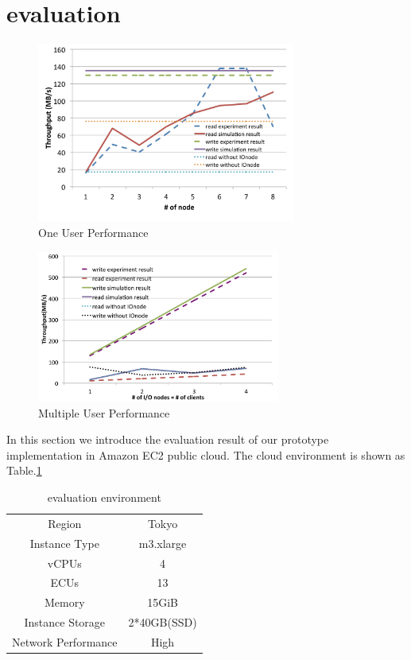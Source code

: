 \section{evaluation}
\label{sec:evaluation}

\begin{figure}
\centering
\includegraphics[width=8.5cm]{img/one_client.pdf}
\caption{One User Performance}
\label{evaluation:one user}
\end{figure}

\begin{figure}
\centering
\includegraphics[width=8cm]{img/multiple_client.pdf}
\caption{Multiple User Performance}
\label{evaluation:multi user}
\end{figure}

In this section we introduce the evaluation result of our prototype implementation in Amazon EC2 public cloud.
The cloud environment is shown as Table.\ref{evaluation:amazon_environment}
\begin{table}[h]
\centering
\begin{tabular}{|c|c|}
Region				&		Tokyo		\\
Instance Type		&		m3.xlarge	\\
vCPUs				&		4			\\
ECUs				&		13			\\
Memory				&		15GiB		\\
Instance Storage	&		2*40GB(SSD)	\\
Network Performance	&		High		\\
\end{tabular}
\caption{evaluation environment}
\label{evaluation:amazon_environment}
\end{table}

